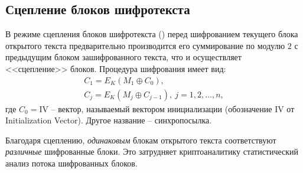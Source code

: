 


\subsection{Сцепление блоков шифротекста}

В режиме сцепления блоков шифротекста () перед шифрованием текущего блока открытого текста предварительно производится его суммирование по модулю $2$ с предыдущим блоком зашифрованного текста, что и осуществляет <<сцепление>> блоков. Процедура шифрования имеет вид:
\[ \begin{array}{l}
    C_1 = E_K(M_1 \oplus C_0), \\
    C_j = E_K(M_j \oplus C_{j-1}), ~ j = 1, 2, \dots, n,
\end{array} \]
где $C_0 = \textrm{IV}$ -- вектор, называемый вектором инициализации (обозначение $\textrm{IV}$ от Initialization Vector). Другое название -- синхропосылка.

Благодаря сцеплению, \emph{одинаковым} блокам открытого текста соответствуют \emph{различные} шифрованные блоки. Это затрудняет криптоаналитику статистический анализ потока шифрованных блоков.


